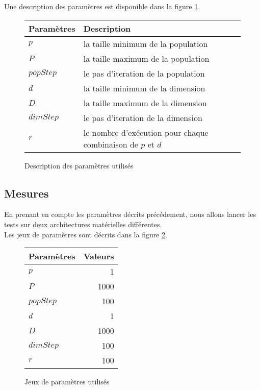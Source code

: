 Une description des paramètres est disponible dans la figure \ref{fig:description_parametres}.

\begin{figure}[here]
  \centering
  \begin{tabular}{ | l | p{7cm} |}
    \hline
    \textbf{Paramètres} & \textbf{Description}\\\hline
    $p$ & la taille minimum de la population\\\hline
    $P$ & la taille maximum de la population\\\hline
    $popStep$ & le pas d'iteration de la population\\\hline
    $d$ & la taille minimum de la dimension\\\hline
    $D$ & la taille maximum de la dimension\\\hline
    $dimStep$ & le pas d'iteration de la dimension\\\hline
    $r$ & le nombre d'exécution pour chaque combinaison de $p$ et $d$\\\hline
  \end{tabular}
  \caption{Description des paramètres utilisés}
  \label{fig:description_parametres}
\end{figure}

\subsection{Mesures}

En prenant en compte les paramètres décrits précédement, nous allons lancer les tests sur deux architectures matérielles différentes.\\

Les jeux de paramètres sont décrits dans la figure \ref{fig:jeux_parametres}.

\begin{figure}[here]
  \centering
  \begin{tabular}{ | l | r |}
    \hline
    \textbf{Paramètres} & \textbf{Valeurs}\\\hline
    $p$ & 1\\\hline
    $P$ & 1000\\\hline
    $popStep$ & 100\\\hline
    $d$ & 1\\\hline
    $D$ & 1000\\\hline
    $dimStep$ & 100\\\hline
    $r$ & 100\\\hline
  \end{tabular}
  \caption{Jeux de paramètres utilisés}
  \label{fig:jeux_parametres}
\end{figure}

